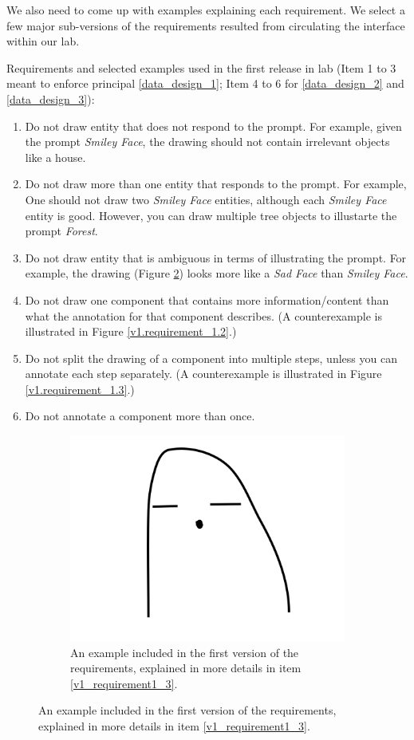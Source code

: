 We also need to come up with examples explaining each requirement. We select a few major sub-versions of the requirements resulted from circulating the interface within our lab.  

Requirements and selected examples used in the first release in lab (Item 1 to 3 meant to enforce principal \ref{data_design_1}; Item 4 to 6 for \ref{data_design_2} and \ref{data_design_3}):
\begin{enumerate}
\item Do not draw entity that does not respond to the prompt. For example, given the prompt \textit{Smiley Face}, the drawing should not contain irrelevant objects like a house. 
\item Do not draw more than one entity that responds to the prompt. For example, One should not draw two \textit{Smiley Face} entities, although each \textit{Smiley Face} entity is good. However, you can draw multiple tree objects to illustarte the prompt \textit{Forest}.  
\item \label{v1_requirement1_3} Do not draw entity that is ambiguous in terms of illustrating the prompt. For example, the drawing (Figure \ref{v1.requirement_1.1}) looks more like a \textit{Sad Face} than \textit{Smiley Face}.
\item Do not draw one component that contains more information/content than what the annotation for that component describes. (A counterexample is illustrated in Figure \ref{v1.requirement_1.2}.)
\item Do not split the drawing of a component into multiple steps, unless you can annotate each step separately. (A counterexample is illustrated in Figure \ref{v1.requirement_1.3}.)
\item Do not annotate a component more than once.
\end{enumerate}

\begin{figure}[!htb]
\begin{subfigure}{0.5\textwidth}
    \centering
    \includegraphics[width=.4\linewidth]{data_collection/host_amazon/hit_1/bad_smiley_face_ambiguous_face.png}  
    \caption{An example included in the first version of the requirements, explained in more details in item \ref{v1_requirement1_3}.}
    \label{v1.requirement_1.1}
\end{subfigure}
\end{figure}

